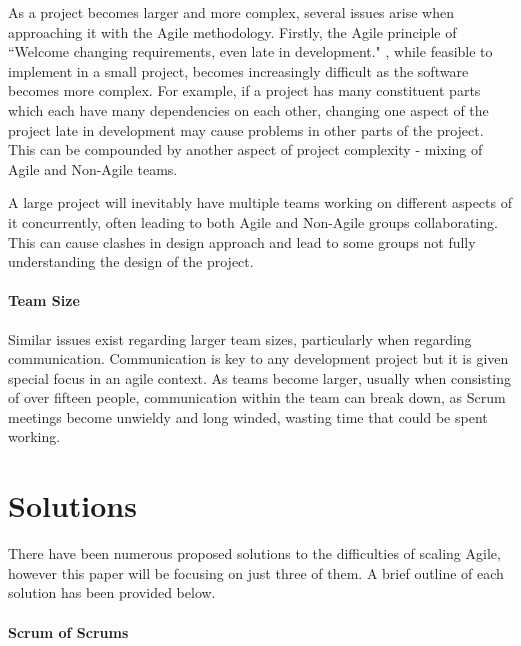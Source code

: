 \documentclass{scrartcl}
\begin{document}
As a project becomes larger and more complex, several issues arise when approaching it with the Agile methodology. Firstly, the Agile principle of ``Welcome changing requirements, even late in development." \cite{AgileManifesto}, while feasible to implement in a small project, becomes increasingly difficult as the software becomes more complex. For example, if a project has many constituent parts which each have many dependencies on each other, changing one aspect of the project late in development may cause problems in other parts of the project. This can be compounded by another aspect of project complexity - mixing of Agile and Non-Agile teams. \cite{reifer2003scaling}

A large project will inevitably have multiple teams working on different aspects of it concurrently, often leading to both Agile and Non-Agile groups collaborating. This can cause clashes in design approach and lead to some groups not fully understanding the design of the project. 

 

\paragraph{Team Size}\mbox{}\newline

Similar issues exist regarding larger team sizes, particularly when regarding communication. Communication is key to any development project but it is given special focus in an agile context. \cite{stoica2013software} As teams become larger, usually when consisting of over fifteen people, \cite{ambler2009agile} communication within the team can break down, as Scrum meetings become unwieldy and long winded, wasting time that could be spent working.

\section{Solutions}

There have been numerous proposed solutions to the difficulties of scaling Agile, however this paper will be focusing on just three of them. A brief outline of each solution has been provided below.

\paragraph{Scrum of Scrums}\mbox{}\newline
\end{document}
